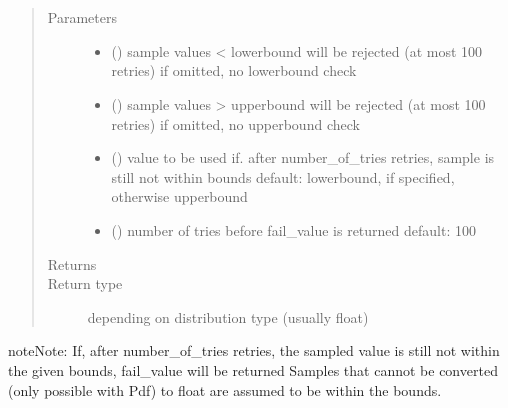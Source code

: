 \documentclass[letterpaper,10pt,english]{sphinxmanual}
\begin{document}
\begin{fulllineitems}
\label{\detokenize{Reference:salabim._Distribution}}~

\begin{fulllineitems}
\label{\detokenize{Reference:salabim._Distribution.bounded_sample}}~\begin{quote}\begin{description}
\item[{Parameters}] \leavevmode\begin{itemize}
\item {} 
 () \textendash{} sample values \textless{} lowerbound will be rejected (at most 100 retries) 
if omitted, no lowerbound check

\item {} 
 () \textendash{} sample values \textgreater{} upperbound will be rejected (at most 100 retries) 
if omitted, no upperbound check

\item {} 
 () \textendash{} value to be used if. after number\_of\_tries retries, sample is still not within bounds 
default: lowerbound, if specified, otherwise upperbound

\item {} 
 () \textendash{} number of tries before fail\_value is returned 
default: 100

\end{itemize}

\item[{Returns}] \leavevmode
{}

\item[{Return type}] \leavevmode
depending on distribution type (usually float)

\end{description}\end{quote}

\begin{sphinxadmonition}{note}{Note:}
If, after number\_of\_tries retries, the sampled value is still not within the given bounds,
fail\_value  will be returned 
Samples that cannot be converted (only possible with Pdf) to float are assumed to be within the bounds.
\end{sphinxadmonition}

\end{fulllineitems}


\end{fulllineitems}
\end{document}

